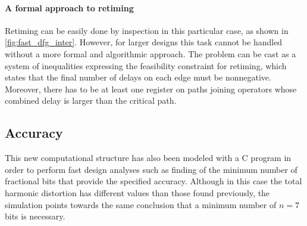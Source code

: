 \paragraph{A formal approach to retiming} Retiming can be easily done by inspection in this particular case, as shown in \autoref{fig:fast_dfg_inter}. However, for larger designs this task cannot be handled without a more formal and algorithmic approach. The problem can be cast as a system of inequalities expressing the feasibility constraint for retiming, which states that the final number of delays on each edge must be nonnegative. Moreover, there has to be at least one register on paths joining operators whose combined delay is larger than the critical path. 


\subsection{Accuracy}
This new computational structure has also been modeled with a C program in order to perform fast design analyses such as finding of the minimum number of fractional bits that provide the specified accuracy. Although in this case the total harmonic distortion has different values than those found previously, the simulation points towards the same conclusion that a minimum number of $n=7$ bits is necessary.

